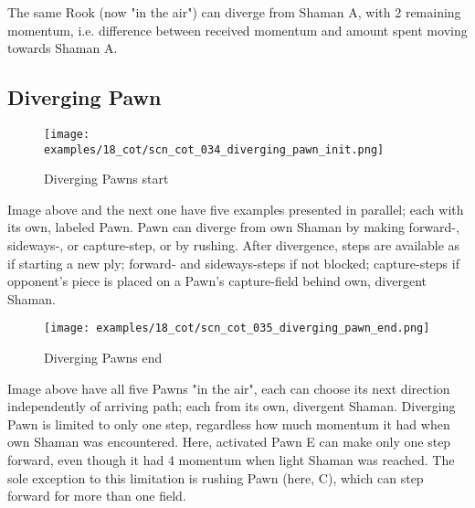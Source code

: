 The same Rook (now "in the air") can diverge from Shaman A, with 2 remaining momentum,
i.e. difference between received momentum and amount spent moving towards Shaman A.

\clearpage %

\subsection*{Diverging Pawn}
\label{sec:Conquest of Tlalocan/Divergence/Diverging Pawn/2} %

\vspace*{-1.4\baselineskip}
\noindent
\begin{figure}[!h]
\texttt{[image: examples/18\_cot/scn\_cot\_034\_diverging\_pawn\_init.png]}
\vspace*{-1.3\baselineskip}
\caption{Diverging Pawns start}
\label{fig:scn_cot_034_diverging_pawn_init}
\end{figure}

\vspace*{-0.5\baselineskip}
Image above and the next one have five examples presented in parallel; each with
its own, labeled Pawn. \newline
\indent
Pawn can diverge from own Shaman by making forward-, sideways-, or capture-step,
or by rushing. After divergence, steps are available as if starting a new ply;
forward- and sideways-steps if not blocked; capture-steps if opponent's piece is
placed on a Pawn's capture-field behind own, divergent Shaman.

\clearpage %

\vspace*{-2.1\baselineskip}
\noindent
\begin{figure}[!h]
\texttt{[image: examples/18\_cot/scn\_cot\_035\_diverging\_pawn\_end.png]}
\vspace*{-1.3\baselineskip}
\caption{Diverging Pawns end}
\label{fig:scn_cot_035_diverging_pawn_end}
\end{figure}

\vspace*{-0.4\baselineskip}
Image above have all five Pawns "in the air", each can choose its next direction
independently of arriving path; each from its own, divergent Shaman. \newline
\indent
Diverging Pawn is limited to only one step, regardless how much momentum it had
when own Shaman was encountered. Here, activated Pawn E can make only one step
forward, even though it had 4 momentum when light Shaman was reached. The sole
exception to this limitation is rushing Pawn (here, C), which can step forward
for more than one field.

